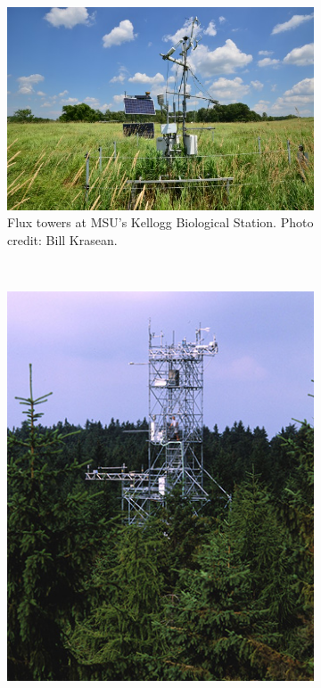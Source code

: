 \documentclass{article}
\begin{document}
\begin{figure}[!ht]
    \centering
    \begin{subfigure}[ht]{0.43\textwidth}
        \includegraphics[width=\textwidth]{FluxTowerPic.jpg}
        \caption{Flux towers at MSU's Kellogg Biological Station. Photo credit: Bill Krasean.}
    \end{subfigure}
    ~ %
    \begin{subfigure}[ht]{0.3\textwidth}
        \includegraphics[width=\textwidth]{FluxTowerPic2.jpg}

\end{subfigure}
\end{figure}
\end{document}
